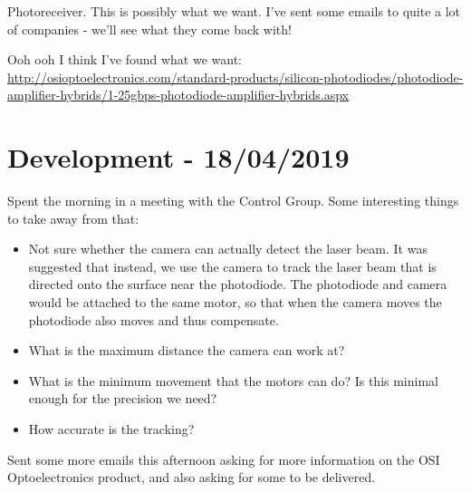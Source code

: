 Photoreceiver. This is possibly what we want. I've sent some emails to quite
a lot of companies - we'll see what they come back with!

Ooh ooh I think I've found what we want:
\url{http://osioptoelectronics.com/standard-products/silicon-photodiodes/photodiode-amplifier-hybrids/1-25gbps-photodiode-amplifier-hybrids.aspx}

\section{Development - 18/04/2019}
Spent the morning in a meeting with the Control Group. Some interesting things
to take away from that:

\begin{itemize}
\item{Not sure whether the camera can actually detect the laser beam. It was
suggested that instead, we use the camera to track the laser beam that is
directed onto the surface near the photodiode. The photodiode and camera would
be attached to the same motor, so that when the camera moves the photodiode
also moves and thus compensate.}
\item{What is the maximum distance the camera can work at?}
\item{What is the minimum movement that the motors can do? Is this minimal
enough for the precision we need?}
\item{How accurate is the tracking?}
\end{itemize}

Sent some more emails this afternoon asking for more information on the
OSI Optoelectronics product, and also asking for some to be delivered.
